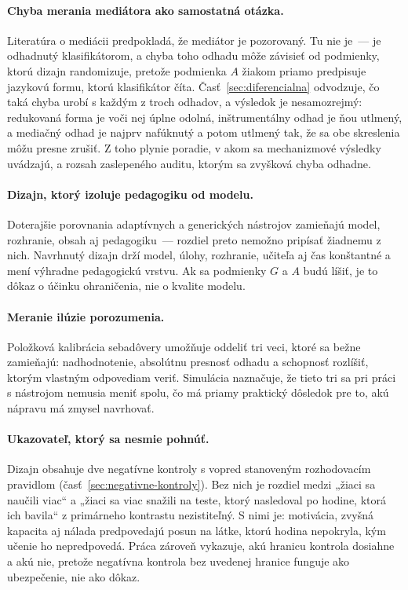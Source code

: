 \paragraph{Chyba merania mediátora ako samostatná otázka.} Literatúra o mediácii predpokladá, že mediátor je pozorovaný. Tu nie je~--- je odhadnutý klasifikátorom, a chyba toho odhadu môže závisieť od podmienky, ktorú dizajn randomizuje, pretože podmienka $A$ žiakom priamo predpisuje jazykovú formu, ktorú klasifikátor číta. Časť~\ref{sec:diferencialna} odvodzuje, čo taká chyba urobí s každým z troch odhadov, a výsledok je nesamozrejmý: redukovaná forma je voči nej úplne odolná, inštrumentálny odhad je ňou utlmený, a mediačný odhad je najprv nafúknutý a potom utlmený tak, že sa obe skreslenia môžu presne zrušiť. Z toho plynie poradie, v akom sa mechanizmové výsledky uvádzajú, a rozsah zaslepeného auditu, ktorým sa zvyšková chyba odhadne.

\paragraph{Dizajn, ktorý izoluje pedagogiku od modelu.} Doterajšie porovnania adaptívnych a generických nástrojov zamieňajú model, rozhranie, obsah aj pedagogiku~--- rozdiel preto nemožno pripísať žiadnemu z nich. Navrhnutý dizajn drží model, úlohy, rozhranie, učiteľa aj čas konštantné a mení výhradne pedagogickú vrstvu. Ak sa podmienky $G$ a $A$ budú líšiť, je to dôkaz o účinku ohraničenia, nie o kvalite modelu.

\paragraph{Meranie ilúzie porozumenia.} Položková kalibrácia sebadôvery umožňuje oddeliť tri veci, ktoré sa bežne zamieňajú: nadhodnotenie, absolútnu presnosť odhadu a schopnosť rozlíšiť, ktorým vlastným odpovediam veriť. Simulácia naznačuje, že tieto tri sa pri práci s nástrojom nemusia meniť spolu, čo má priamy praktický dôsledok pre to, akú nápravu má zmysel navrhovať.

\paragraph{Ukazovateľ, ktorý sa nesmie pohnúť.} Dizajn obsahuje dve negatívne kontroly s vopred stanoveným rozhodovacím pravidlom (časť~\ref{sec:negativne-kontroly}). Bez nich je rozdiel medzi „žiaci sa naučili viac“ a „žiaci sa viac snažili na teste, ktorý nasledoval po hodine, ktorá ich bavila“ z primárneho kontrastu nezistiteľný. S nimi je: motivácia, zvyšná kapacita aj nálada predpovedajú posun na látke, ktorú hodina nepokryla, kým učenie ho nepredpovedá. Práca zároveň vykazuje, akú hranicu kontrola dosiahne a akú nie, pretože negatívna kontrola bez uvedenej hranice funguje ako ubezpečenie, nie ako dôkaz.

